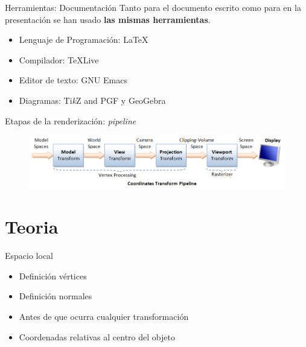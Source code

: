 \documentclass{beamer}
\begin{document}
\begin{frame}{Herramientas: Documentación}
  Tanto para el documento escrito como para en la presentación se han usado \textbf{las mismas herramientas}.
  \begin{itemize}
  \item{Lenguaje de Programación: \textrm{\LaTeX}}
  \item{Compilador: \textrm{\TeX  Live}}
  \item{Editor de texto: GNU Emacs}
  \item{Diagramas: Ti\textit{k}Z and PGF y GeoGebra}
  \end{itemize}
\end{frame}


\begin{frame}{Etapas de la renderización: \textit{pipeline}}
  \begin{figure}
    \centering
    \includegraphics[width=\textwidth]{img/pipeline}
    \end{figure}
\end{frame}

\section{Teoria}
\begin{frame}{Espacio local}
  \begin{itemize}
  \item{Definición vértices}
  \item{Definición normales}
  \item{Antes de que ocurra cualquier transformación}
  \item{Coordenadas relativas al centro del objeto}
  \end{itemize}

  \begin{figure} [h!]
    \centering
  \end{figure}
  
\end{frame}
\end{document}
